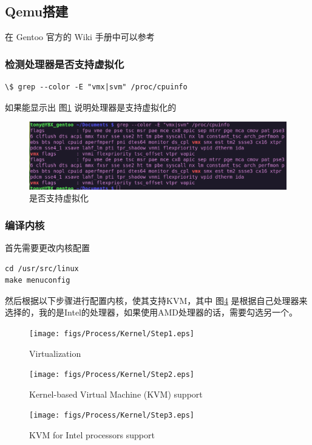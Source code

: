 \subsection{Qemu搭建}
在 Gentoo 官方的 Wiki 手册中可以参考 \cite{GentooQemu}
\subsubsection{检测处理器是否支持虚拟化}
\begin{lstlisting}
\$ grep --color -E "vmx|svm" /proc/cpuinfo 
\end{lstlisting}
如果能显示出 图\ref{fig:vmx_svm} 说明处理器是支持虚拟化的

\begin{figure}[htbp]
  \centering %
  \includegraphics[width=0.8 \textwidth]{figs/Process/vmx_svm.eps}
  \caption{是否支持虚拟化}
  \label{fig:vmx_svm} %
\end{figure}

\subsubsection{编译内核}
首先需要更改内核配置

\begin{lstlisting}
cd /usr/src/linux
make menuconfig 
\end{lstlisting}

然后根据以下步骤进行配置内核，使其支持KVM，其中 图\ref{fig:KVM_Intel} 是根据自己处理器来选择的，我的是Intel的处理器，如果使用AMD处理器的话，需要勾选另一个。

\begin{figure}[htbp]
  \centering %
  \texttt{[image: figs/Process/Kernel/Step1.eps]}
  \caption{Virtualization}
  \label{fig:Virtualization} %
\end{figure}

\begin{figure}[htbp]
  \centering %
  \texttt{[image: figs/Process/Kernel/Step2.eps]}
  \caption{Kernel-based Virtual Machine (KVM) support}
  \label{fig:Kernel-based} %
\end{figure}

\begin{figure}[htbp]
  \centering %
  \texttt{[image: figs/Process/Kernel/Step3.eps]}
  \caption{KVM for Intel processors support}
  \label{fig:KVM_Intel} %
\end{figure}

